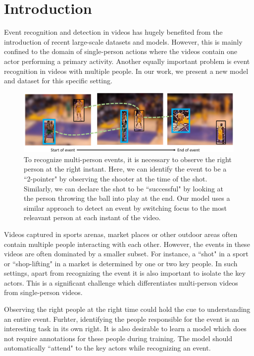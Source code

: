 
\section{Introduction}

Event recognition and detection in videos has hugely benefited from the
introduction of recent large-scale datasets \cite{THUMOS,UCF101,Karpathy_CVPR14,MED11} and models.
However, this is mainly confined to the domain of single-person actions
where the videos contain one actor performing a primary activity.
Another equally important problem is event recognition in
videos with multiple people. In our work, we present a new model
and dataset for this specific setting.

\begin{figure}[ht!]
\begin{center}
  \includegraphics[width=3.5 in]{images/pull_figure_v2_cropped.pdf}
\end{center}
\caption{To recognize multi-person events, it is necessary to observe the right
person at the right instant. Here, we can identify the
event to be a ``2-pointer" by observing the shooter at the time of the shot.
Similarly, we can declare the shot to be ``successful" by looking at the
person throwing the ball into play at the end. Our model uses a similar approach to detect
an event by switching focus to the most releavant person at each instant of the video.}
\label{fig:pull_figure}
\end{figure}

Videos captured in sports arenas, market places or other outdoor areas
often contain multiple people interacting with each other.
However, the events in these videos are often
dominated by a smaller subset. For instance, a ``shot" in a sport
or ``shop-lifting" in a market is determined by one or two key people.
In such settings, apart from recognizing the event it is also important
to isolate the key actors. This is a significant challenge which
differentiates multi-person videos from single-person videos.

Observing the right people at the right time could hold the cue to
understanding an entire event. Furhter, identifying the people responsible for
the event is an interesting task in its own right.  It is also desirable to
learn a model which does not require annotations for these people during
training. The model should automatically ``attend" to the key actors while recognizing an event.


